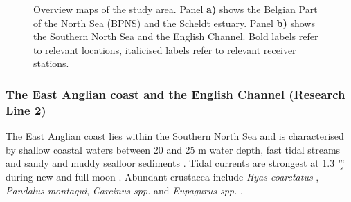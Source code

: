 \documentclass[
  authoryear,
  review,
  3p]{elsarticle}
\begin{document}
\begin{figure}

\begin{minipage}[t]{\linewidth}

{\centering 


}

\end{minipage}%
\newline
\begin{minipage}[t]{\linewidth}

{\centering 


}

\end{minipage}%

\caption{\label{fig-mapstudyarea}Overview maps of the study area. Panel
\textbf{a)} shows the Belgian Part of the North Sea (BPNS) and the
Scheldt estuary. Panel \textbf{b)} shows the Southern North Sea and the
English Channel. Bold labels refer to relevant locations, italicised
labels refer to relevant receiver stations.}

\end{figure}

\hypertarget{sec-mmstudyareaec}{%
\subsubsection{The East Anglian coast and the English Channel (Research
Line 2)}\label{sec-mmstudyareaec}}

The East Anglian coast lies within the Southern North Sea and is
characterised by shallow coastal waters between 20 and 25 m water depth,
fast tidal streams and sandy and muddy seafloor sediments
\citep{harrison_1990}. Tidal currents are strongest at 1.3
\(\frac{m}{s}\) during new and full moon \citep{arnold_1994}. Abundant
crustacea include \emph{Hyas coarctatus} \citep{dyer_1985},
\emph{Pandalus montagui}, \emph{Carcinus spp.} and \emph{Eupagurus spp.}
\citep{sergeant_1951}.
\end{document}
